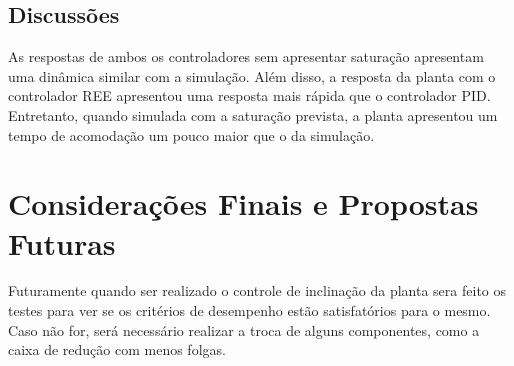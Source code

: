 \documentclass[conference,harvard,brazil,english]{sbatex}
\begin{document}
        \subsection{Discussões}
            As respostas de ambos os controladores sem apresentar saturação apresentam uma dinâmica similar com a simulação. Além disso, a resposta da planta com o controlador REE apresentou uma resposta mais rápida que o controlador PID. Entretanto, quando simulada com a saturação prevista, a planta apresentou um tempo de acomodação um pouco maior que o da simulação.
        
        
    \section{Considerações Finais e Propostas Futuras}
    
        Futuramente quando ser realizado o controle de inclinação da planta sera feito os testes para ver se os critérios de desempenho estão satisfatórios para o mesmo. Caso não for, será necessário realizar a troca de alguns componentes, como a caixa de redução com menos folgas.
        
    \nocite{*}
    
    
    
\end{document}
